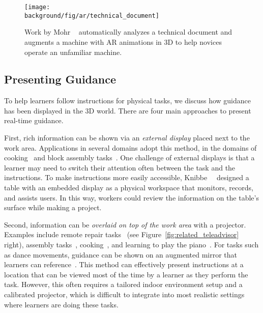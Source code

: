 \begin{figure*}[t!]
  \centering
  \texttt{[image: \\background/fig/ar/technical\_document]}
  \caption{Work by Mohr \ea{}~\cite{Mohr:2015:RTD:2702123.2702490} automatically analyzes a technical document and augments a machine with AR animations in 3D to help novices operate an unfamiliar machine.}
  \label{fig:related_ar_annotation}
\end{figure*}

\subsection{Presenting Guidance}
To help learners follow instructions for physical tasks, we discuss how guidance has been displayed in the 3D world. There are four main approaches to present real-time guidance.

First, rich information can be shown via an \emph{external display} placed next to the work area. Applications in several domains adopt this method, in the domains of cooking~\cite{Uriu:2012:PRM:2207676.2207695} and block assembly tasks~\cite{Gupta2012DuploTrack,Wu:2016:ARI:2856400.2856416}. One challenge of external displays is that a learner may need to switch their attention often between the task and the instructions. To make instructions more easily accessible, Knibbe~\ea{}~\cite{Knibbe:2015:SMI:2817721.2817741} designed a table with an embedded display as a physical workspace that monitors, records, and assists users. In this way, workers could review the information on the table's surface while making a project.

Second, information can be \emph{overlaid on top of the work area} with a projector. Examples include remote repair tasks~\cite{Gurevich:2012ko} (see Figure~\ref{fig:related_teleadvisor} right), assembly tasks~\cite{Kirk:2006:CRG:1124772.1124951}, cooking~\cite{Ju:2001:CIC:634067.634227}, and learning to play the piano~\cite{Xiao:2016:IEI:2858036.2858577}.
%
For tasks such as dance movements, guidance can be shown on an augmented mirror that learners can reference~\cite{Anderson:2013:YEM:2501988.2502045}.
%
This method can effectively present instructions at a location that can be viewed most of the time by a learner as they perform the task. However, this often requires a tailored indoor environment setup and a calibrated projector, which is difficult to integrate into most realistic settings where learners are doing these tasks.

